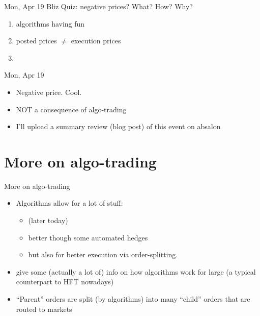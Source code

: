 \documentclass[english,10pt
,aspectratio=169
]{beamer}
\begin{document}
\begin{frame}[handout:0]{Mon, Apr 19}
	\alert{Bliz Quiz}: negative prices? What? How? Why?
	\begin{enumerate}
		\item algorithms having fun
		\item posted prices $\neq$ execution prices
		\item {}
	\end{enumerate}
\end{frame}
	

\begin{frame}{Mon, Apr 19}
	\begin{itemize}
		\item Negative price. Cool.
		\item \alert{NOT} a consequence of algo-trading
		\item I'll upload a summary review (blog post) of this event on absalon
	\end{itemize}
\end{frame}



\section{More on algo-trading}

\begin{frame}{More on algo-trading}
	\begin{itemize}
		\item Algorithms allow for a lot of stuff:
		\begin{itemize}
			\item {} (later today)
			\item better  though some automated hedges
			\item but also for better \alert{execution} via order-splitting.
		\end{itemize}
		\item \cite{beason_anatomy_2019} give some (actually a lot of) info on how algorithms work for large  (a typical counterpart to HFT nowadays)
		\item ``Parent'' orders are split (by algorithms) into many ``child'' orders that are routed to markets
	\end{itemize}
\end{frame}
\end{document}
